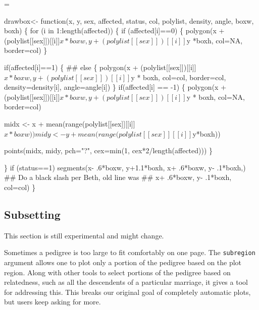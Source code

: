 \documentclass{article}
\begin{document}
\begin{nwchunk}
=
 
   drawbox<- function(x, y, sex, affected, status, col, polylist,
             density, angle, boxw, boxh) \{
         for (i in 1:length(affected)) \{
             if (affected[i]==0) \{
                 polygon(x + (polylist[[sex]])[[i]]$x *boxw,
                         y + (polylist[[sex]])[[i]]$y *boxh,
                         col=NA, border=col)
                 \}
             
             if(affected[i]==1) \{
               ## else \{
               polygon(x + (polylist[[sex]])[[i]]$x * boxw,
                       y + (polylist[[sex]])[[i]]$y * boxh,
                       col=col, border=col, density=density[i], angle=angle[i])            
             \}
             if(affected[i] == -1) \{
               polygon(x + (polylist[[sex]])[[i]]$x * boxw,
                       y + (polylist[[sex]])[[i]]$y * boxh,
                       col=NA, border=col)
               
               midx <- x + mean(range(polylist[[sex]][[i]]$x*boxw))
               midy <- y + mean(range(polylist[[sex]][[i]]$y*boxh))
              
               points(midx, midy, pch="?", cex=min(1, cex*2/length(affected)))
             \}
             
           \}
         if (status==1) segments(x- .6*boxw, y+1.1*boxh, 
                                 x+ .6*boxw, y- .1*boxh,)
         ## Do a black slash per Beth, old line was
         ##        x+ .6*boxw, y- .1*boxh, col=col)
       \}
 
\end{nwchunk}

\subsection{Subsetting}
This section is still experimental and might change.  

Sometimes a pedigree is too large to fit comfortably on one page.
The \Verb!subregion! argument allows one to plot only a portion of the
pedigree based on the plot region.  Along with other tools to
select portions of the pedigree based on relatedness, such as all
the descendents of a particular marriage, it gives a tool for
addressing this.  This breaks our original goal of completely
automatic plots, but users keep asking for more.
\end{document}
